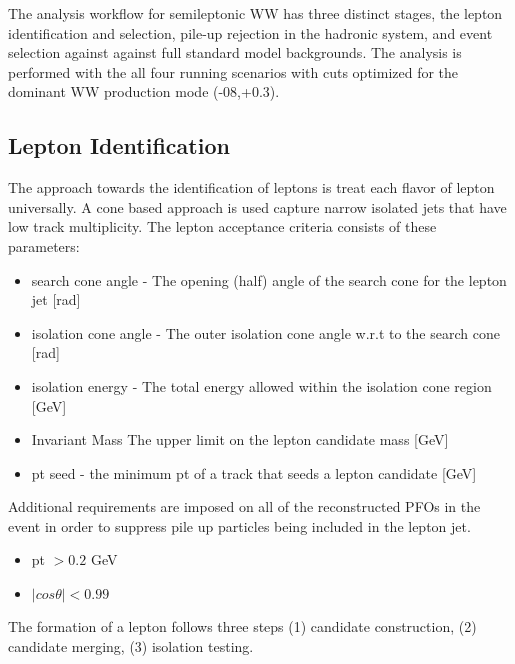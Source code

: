 The analysis workflow for semileptonic WW has three distinct stages, the lepton identification and selection, pile-up rejection in the hadronic system, and event selection against against full standard model backgrounds. The analysis is performed with the all four running scenarios with cuts optimized for the dominant WW production mode (-08,+0.3). 


\subsection{Lepton Identification}
\label{subsec:Lepton_ID}
The approach towards the identification of leptons is treat each flavor of lepton universally. A cone based approach is used capture narrow isolated jets that have low track multiplicity. The lepton acceptance criteria consists of these  parameters:
\begin{itemize}
\item search cone angle - The opening (half) angle of the search cone for the lepton jet [rad]
\item isolation cone angle - The outer isolation cone angle w.r.t to the search cone [rad]
\item isolation energy - The total energy allowed within the isolation cone region [GeV]
\item Invariant Mass The upper limit on the lepton candidate mass [GeV]
\item pt seed - the minimum pt of a track that seeds a lepton candidate [GeV] 
\end{itemize}
Additional requirements are imposed on all of the reconstructed PFOs in the event in order to suppress pile up particles being included in the lepton jet.
\begin{itemize}
\item pt $> 0.2$ GeV
\item $|cos\theta| < 0.99$
\end{itemize}
The formation of a lepton follows three steps (1) candidate construction, (2) candidate merging, (3) isolation testing.
